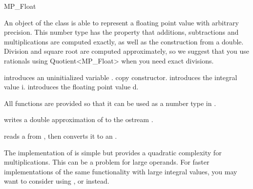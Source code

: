 
\begin{ccClass} {MP_Float}
\label{mpfloat}

\ccDefinition
An object of the class  is able to represent a floating point
value with arbitrary precision.  This number type has the property that
additions, subtractions and multiplications are computed exactly, as well as
the construction from a double.  Division and square root are computed
approximately, so we suggest that you use rationals using Quotient<MP\_Float>
when you need exact divisions.


\ccCreation
{}

{introduces an uninitialized variable \ccVar.}
\ccGlue
{}
{copy constructor.}
\ccGlue
{}
{introduces the integral value i.}
\ccGlue
{}
{introduces the floating point value d.}

\ccOperations
All functions are provided so that it can be used as a number type in
\cgal.

{writes a double approximation of  to the ostream .}

{reads a  from , then converts it to an .}

\end{ccClass} 

\ccImplementation 
The implementation of  is simple but provides a quadratic
complexity for multiplications.  This can be a problem for large operands.
For faster implementations of the same functionality with large integral
values, you may want to consider using ,  or 
instead.

